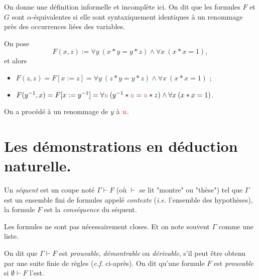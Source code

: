 \documentclass[./main]{subfiles}
\begin{document}
  \begin{defn}[Renommage]
    On donne une définition informelle et incomplète ici.
    On dit que les formules $F$ et $G$ sont $\alpha$-équivalentes si elle sont syntaxiquement identiques à un renommage près des occurrences liées des variables.
  \end{defn}

  \begin{exm}
    On pose \[
    F(x,z) := \forall y\:(x * y = y * z) \land \forall x\: (x * x = 1)
    ,\]
    et alors 
    \begin{itemize}
      \item $F(z,z) = F[x := z] = \forall y\:(z * y = y * z) \land \forall x\: (x * x = 1)$ ;
      \item $F(y^{-1}, x) = F[x := y^{-1}] = \forall {\color{nicered} u}\:(y^{-1} * {\color{nicered} u} = {\color{nicered} u} * z) \land \forall x\: (x * x = 1)$.
    \end{itemize}
    On a procédé à un renommage de $y$ à ${\color{red} u}$.
  \end{exm}

  \section{Les démonstrations en déduction naturelle.}

  \begin{defn}
    Un \textit{séquent} est un coupe noté $\Gamma \vdash F$ (où $\vdash $ se lit "montre" ou "thèse") tel que $\Gamma$ est un ensemble fini de formules appelé \textit{contexte} (\textit{i.e.} l'ensemble des hypothèses), la formule $F$ est la \textit{conséquence} du séquent.
  \end{defn}

  \begin{rmk}
    Les formules ne sont pas nécessairement closes. Et on note souvent $\Gamma$ comme une liste.
  \end{rmk}

  \begin{defn}
    On dit que $\Gamma \vdash F$ est \textit{prouvable}, \textit{démontrable} ou \textit{dérivable}, s'il peut être obtenu par une suite finie de règles (\textit{c.f.} ci-après).
    On dit qu'une formule $F$ est \textit{prouvable} si $\emptyset\vdash F$ l'est.
  \end{defn}
\end{document}
